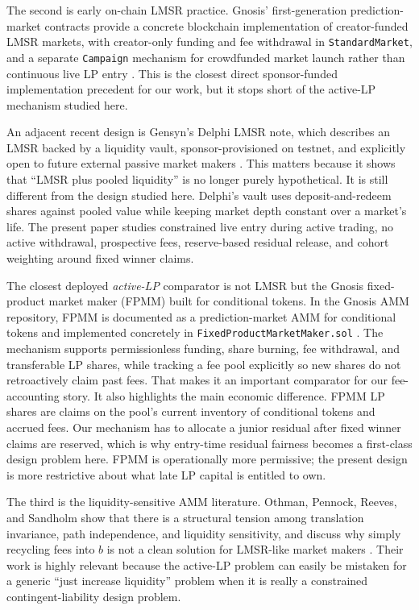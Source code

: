 \documentclass[10pt]{article}
\begin{document}
The second is early on-chain LMSR practice. Gnosis' first-generation prediction-market contracts provide a concrete blockchain implementation of creator-funded LMSR markets, with creator-only funding and fee withdrawal in \texttt{StandardMarket}, and a separate \texttt{Campaign} mechanism for crowdfunded market launch rather than continuous live LP entry \cite{gnosisstandard,gnosiscampaign}. This is the closest direct sponsor-funded implementation precedent for our work, but it stops short of the active-LP mechanism studied here.

An adjacent recent design is Gensyn's Delphi LMSR note, which describes an LMSR backed by a liquidity vault, sponsor-provisioned on testnet, and explicitly open to future external passive market makers \cite{gensyndelphi}. This matters because it shows that ``LMSR plus pooled liquidity'' is no longer purely hypothetical. It is still different from the design studied here. Delphi's vault uses deposit-and-redeem shares against pooled value while keeping market depth constant over a market's life. The present paper studies constrained live entry during active trading, no active withdrawal, prospective fees, reserve-based residual release, and cohort weighting around fixed winner claims.

The closest deployed \emph{active-LP} comparator is not LMSR but the Gnosis fixed-product market maker (FPMM) built for conditional tokens. In the Gnosis AMM repository, FPMM is documented as a prediction-market AMM for conditional tokens and implemented concretely in \texttt{FixedProductMarketMaker.sol} \cite{gnosisfpmmrepo,gnosisfpmmcode}. The mechanism supports permissionless funding, share burning, fee withdrawal, and transferable LP shares, while tracking a fee pool explicitly so new shares do not retroactively claim past fees. That makes it an important comparator for our fee-accounting story. It also highlights the main economic difference. FPMM LP shares are claims on the pool's current inventory of conditional tokens and accrued fees. Our mechanism has to allocate a junior residual after fixed winner claims are reserved, which is why entry-time residual fairness becomes a first-class design problem here. FPMM is operationally more permissive; the present design is more restrictive about what late LP capital is entitled to own.

The third is the liquidity-sensitive AMM literature. Othman, Pennock, Reeves, and Sandholm show that there is a structural tension among translation invariance, path independence, and liquidity sensitivity, and discuss why simply recycling fees into $b$ is not a clean solution for LMSR-like market makers \cite{othmansandholm2010}. Their work is highly relevant because the active-LP problem can easily be mistaken for a generic ``just increase liquidity'' problem when it is really a constrained contingent-liability design problem.
\end{document}
